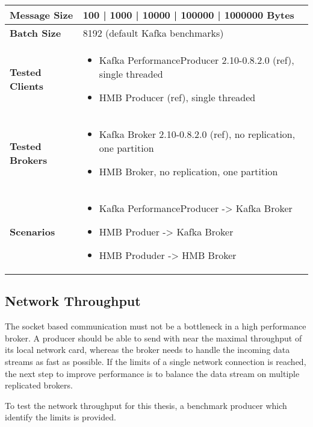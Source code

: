 \begin{table}[H]
\begin{tabular}{|l| p{12cm}|} \hline
{\bf Message Size}   & 100 | 1000 | 10000 | 100000 | 1000000 Bytes \\ \hline
{\bf Batch Size}     & 8192 (default Kafka benchmarks)\\ \hline
{\bf Tested Clients} &
    \begin{itemize}
        \item Kafka PerformanceProducer 2.10-0.8.2.0 (ref), single threaded
        \item HMB Producer (ref), single threaded
    \end{itemize}\\ \hline
{\bf Tested Brokers} &
    \begin{itemize}
        \item Kafka Broker 2.10-0.8.2.0 (ref), no replication, one partition
        \item HMB Broker, no replication, one partition
    \end{itemize}\\ \hline
{\bf Scenarios} &
    \begin{itemize}
        \item Kafka PerformanceProducer -> Kafka Broker
        \item HMB Produer -> Kafka Broker
        \item HMB Produder -> HMB Broker
    \end{itemize} \\ \hline
\end{tabular}
\end{table}



\subsection{Network Throughput}
The socket based communication must not be a bottleneck in a high performance
broker. A producer should be able to send with near the maximal throughput of
its local network card, whereas the broker needs to handle the incoming data
streams as fast as possible. If the limits of a single network connection is
reached, the next step to improve performance is to balance the data
stream on multiple replicated brokers.

To test the network throughput for this thesis, a benchmark producer
which identify the limits is provided.



